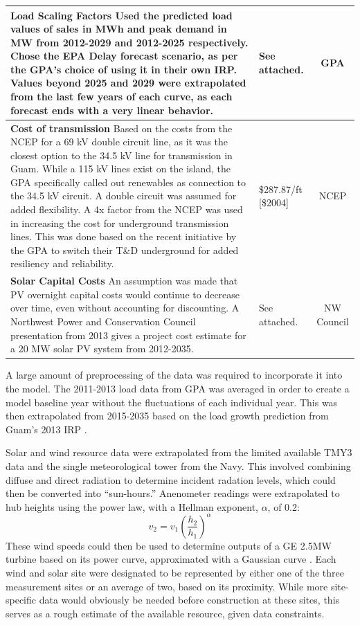 \documentclass[12pt,letterpaper,fleqn]{article}
\begin{document}
\begin{center}
\begin{longtable}{| p{10cm} | p{4cm} | c | }
    \textbf{Load Scaling Factors} Used the predicted load values of
    sales in MWh and peak demand in MW from 2012-2029 and 2012-2025
    respectively. Chose the EPA Delay forecast scenario, as per the
    GPA's choice of using it in their own IRP. Values beyond 2025 and
    2029 were extrapolated from the last few years of each curve, as
    each forecast ends with a very linear behavior. & See attached. &
    GPA \cite{cruz13} \\\hline

    \textbf{Cost of transmission} Based on the costs from the NCEP for
    a 69 kV double circuit line, as it was the closest option to the
    34.5 kV line for transmission in Guam. While a 115 kV lines exist
    on the island, the GPA specifically called out renewables as
    connection to the 34.5 kV circuit. A double circuit was assumed
    for added flexibility. A 4x factor from the NCEP was used in
    increasing the cost for underground transmission lines. This was
    done based on the recent initiative by the GPA to switch their
    T\&D underground for added resiliency and reliability. &
    \$287.87/ft [\$2004] & NCEP \cite{brown04} \\\hline

    \textbf{Solar Capital Costs} An assumption was made that PV
    overnight capital costs would continue to decrease over time,
    even without accounting for discounting. A Northwest Power and
    Conservation Council presentation from 2013 gives a project cost
    estimate for a 20 MW solar PV system from 2012-2035.  & See
    attached. & NW Council \cite{simmons13} \\\hline
  \end{longtable}
\end{center}

A large amount of preprocessing of the data was required to
incorporate it into the model. The 2011-2013 load data from GPA was
averaged in order to create a model baseline year without the
fluctuations of each individual year. This was then extrapolated from
2015-2035 based on the load growth prediction from Guam's 2013 IRP
\cite{cruz13}. 

Solar and wind resource data were extrapolated from the limited
available TMY3 data and the single meteorological tower from the
Navy. This involved combining diffuse and direct radiation to
determine incident radation levels, which could then be converted into
``sun-hours.'' Anenometer readings were extrapolated to hub heights
using the power law, with a Hellman exponent, $\alpha$, of 0.2:
\[v_2 = v_1\left(\frac{h_2}{h_1}\right)^\alpha\] 
These wind speeds could then be used to determine outputs of a GE
2.5MW turbine based on its power curve, approximated with a Gaussian
curve \cite{ge}. Each wind and solar site were designated to be
represented by either one of the three measurement sites or an average
of two, based on its proximity. While more site-specific data would
obviously be needed before construction at these sites, this serves as
a rough estimate of the available resource, given data constraints.
\end{document}
